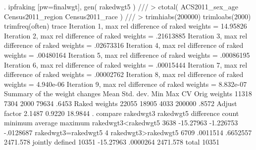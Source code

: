. ipfraking [pw=finalwgt], gen( rakedwgt5 ) ///
>     ctotal( ACS2011_sex_age Census2011_region Census2011_race ) ///
>     trimhiabs(200000) trimloabs(2000) trimfreq(often) trace
{\smallskip}
\cnp
 Iteration 1, max rel difference of raked weights = 14.95826
 Iteration 2, max rel difference of raked weights = .21613885
 Iteration 3, max rel difference of raked weights = .02673316
 Iteration 4, max rel difference of raked weights = .00480164
 Iteration 5, max rel difference of raked weights = .00086195
 Iteration 6, max rel difference of raked weights = .00015444
 Iteration 7, max rel difference of raked weights = .00002762
 Iteration 8, max rel difference of raked weights = 4.940e-06
 Iteration 9, max rel difference of raked weights = 8.832e-07
{\smallskip}
   Summary of the weight changes
{\smallskip}
              {\VBAR}    Mean    Std. dev.    Min        Max       CV
Orig weights  {\VBAR}    11318       7304      2000       79634   .6453
Raked weights {\VBAR}    22055      18905      4033      200000   .8572
Adjust factor {\VBAR}   2.1487               0.9220     18.9844
{\smallskip}
. compare rakedwgt3 rakedwgt5
{\smallskip}
                                         difference 
                            count       minimum      average     maximum
rakedwgt3<rakedwgt5          3638     -15.27963    -1.226753   -.0128687
rakedwgt3=rakedwgt5             4
rakedwgt3>rakedwgt5          6709      .0011514     .6652557    2471.578
jointly defined             10351     -15.27963     .0000264    2471.578
total                       10351
{\smallskip}
